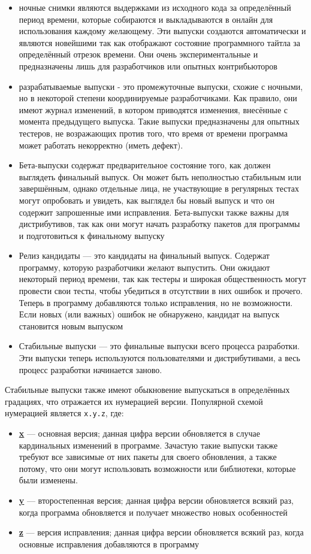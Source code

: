 \documentclass[10pt]{book}
\begin{document}
\begin{itemize}
	\item ночные  снимки являются выдержками из исходного кода за определённый период времени, которые собираются и выкладываются в онлайн для использования каждому желающему. Эти выпуски создаются автоматически и являются новейшими так как отображают состояние программного тайтла за определённый отрезок времени. Они очень экспериментальные и предназначены лишь для разработчиков или опытных контрибьюторов
	\item разрабатываемые выпуски  - это промежуточные выпуски, схожие с ночными, но в некоторой степени координируемые разработчиками. Как правило, они имеют журнал изменений, в котором приводятся изменения, внесённые с момента предыдущего выпуска. Такие выпуски предназначены для опытных тестеров, не возражающих против того, что время от времени программа может работать некорректно (иметь дефект).
	\item Бета-выпуски содержат предварительное состояние того, как должен выглядеть финальный выпуск. Он может быть неполностью стабильным или завершённым, однако отдельные лица, не участвующие в регулярных тестах могут опробовать и увидеть, как выглядел бы новый выпуск и что он содержит запрошенные ими исправления. Бета-выпуски также важны для дистрибутивов, так как они могут начать разработку пакетов для программы и подготовиться к финальному выпуску
	\item Релиз кандидаты — это кандидаты на финальный выпуск.  Содержат программу, которую разработчики желают выпустить. Они ожидают некоторый период времени, так как тестеры и широкая общественность могут провести свои тесты, чтобы убедиться в отсутствии в них ошибок и прочего. Теперь в программу добавляются только исправления, но не возможности. Если новых (или важных) ошибок  не обнаружено, кандидат на выпуск становится новым выпуском
	\item Стабильные выпуски — это финальные выпуски всего процесса разработки. Эти выпуски теперь используются пользователями и дистрибутивами, а весь процесс разработки начинается заново.
\end{itemize}

Стабильные выпуски также имеют обыкновение выпускаться в определённых градациях, что отражается их нумерацией версии. Популярной схемой нумерацией является \texttt{x.y.z}, где: 

\begin{itemize}
	\item \underline{\textbf{x}} --- основная версия; данная цифра версии обновляется в случае кардинальных изменений в программе.  Зачастую такие выпуски также требуют все зависимые от них пакеты для своего обновления, а также потому, что они могут использовать возможности или библиотеки, которые были изменены.
	\item \underline{\textbf{y}}  --- второстепенная версия;  данная цифра версии обновляется всякий раз, когда программа обновляется и получает множество новых особенностей
	\item \underline{\textbf{z}} — версия исправления;  данная цифра версии обновляется всякий раз, когда основные исправления добавляются в программу
\end{itemize}
\end{document}
